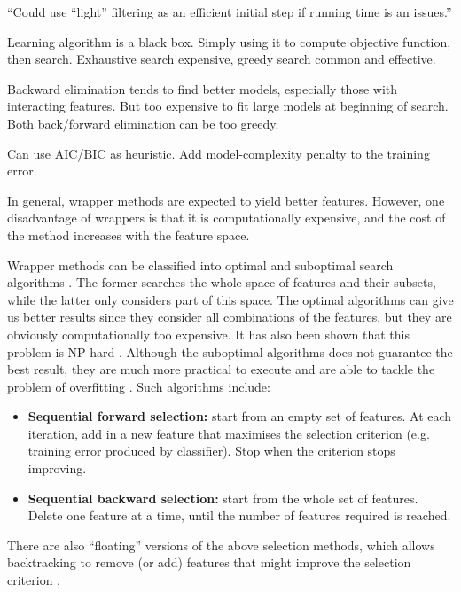 \documentclass[12pt, twoside, a4paper]{article}
\begin{document}
``Could use ``light'' filtering as an efficient initial step if running time is an issues.''	


Learning algorithm is a black box. Simply using it to compute objective function, then search. Exhaustive search expensive, greedy search common and effective.

Backward elimination tends to find better models, especially those with interacting features. But too expensive to fit large models at beginning of search. Both back/forward elimination can be too greedy.

Can use AIC/BIC as heuristic. Add model-complexity penalty to the training error.


In general, wrapper methods are expected to yield better features. However, one disadvantage of wrappers is that it is computationally expensive, and the cost of the method increases with the feature space.

Wrapper methods can be classified into optimal and suboptimal search algorithms \cite{RefWorks:120}. The former searches the whole space of features and their subsets, while the latter only considers part of this space. The optimal algorithms can give us better results since they consider all combinations of the features, but they are obviously computationally too expensive. It has also been shown that this problem is NP-hard \cite{RefWorks:139}. Although the suboptimal algorithms does not guarantee the best result, they are much more practical to execute and are able to tackle the problem of overfitting \cite{RefWorks:140}. Such algorithms include:
\begin{itemize}
\item \textbf{Sequential forward selection:} start from an empty set of features. At each iteration, add in a new feature that maximises the selection criterion (e.g. training error produced by classifier). Stop when the criterion stops improving.
\item \textbf{Sequential backward selection:} start from the whole set of features. Delete one feature at a time, until the number of features required is reached.
\end{itemize}

There are also ``floating'' versions of the above selection methods, which allows backtracking to remove (or add) features that might improve the selection criterion \cite{RefWorks:121}.
\end{document}
